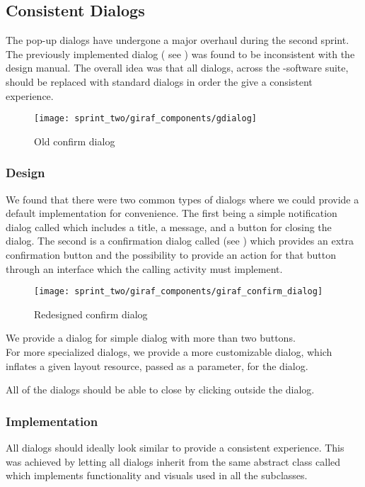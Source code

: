 \subsection{Consistent Dialogs}
\label{sec:consistent_dialogs}


The pop-up dialogs have undergone a major overhaul during the second sprint. The previously implemented dialog ( see ) was found to be inconsistent with the \giraf design manual. The overall idea was that all dialogs, across the \giraf-software suite, should be replaced with standard dialogs in order the give a consistent experience. 

\begin{figure}[!htbp]
    \centering
    \texttt{[image: sprint\_two/giraf\_components/gdialog]}
    \caption{Old confirm dialog}
    \label{fig:gdialog}
\end{figure}

\subsubsection{Design}

We found that there were two common types of dialogs where we could provide a default implementation for convenience. The first being a simple notification dialog called which includes a title, a message, and a button for closing the dialog. The second is a confirmation dialog called (see ) which provides an extra confirmation button and the possibility to provide an action for that button through an interface which the calling activity must implement. 

\begin{figure}[!htbp]
    \centering
    \texttt{[image: sprint\_two/giraf\_components/giraf\_confirm\_dialog]}
    \caption{Redesigned confirm dialog}
    \label{fig:giraf_confirm_dialog}
\end{figure}

We provide a dialog for simple dialog with more than two buttons.\\

For more specialized dialogs, we provide a more customizable dialog, which inflates a given layout resource, passed as a parameter, for the dialog.

All of the dialogs should be able to close by clicking outside the dialog.

\subsubsection{Implementation}

All dialogs should ideally look similar to provide a consistent experience. This was achieved by letting all dialogs inherit from the same abstract class called  which implements functionality and visuals used in all the subclasses.